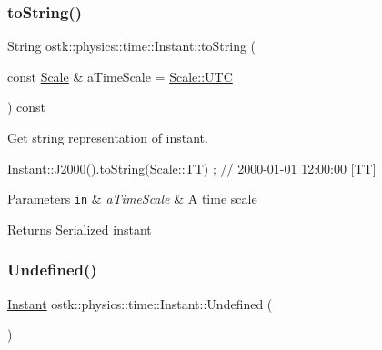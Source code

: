 \subsubsection{\texorpdfstring{to\+String()}{toString()}}
{\footnotesize\ttfamily String ostk\+::physics\+::time\+::\+Instant\+::to\+String (\begin{DoxyParamCaption}\item[{const \hyperlink{namespaceostk_1_1physics_1_1time_adf23d37bd8641fb76a0e98ab46a70df7}{Scale} \&}]{a\+Time\+Scale = {\ttfamily \hyperlink{namespaceostk_1_1physics_1_1time_adf23d37bd8641fb76a0e98ab46a70df7a9234324ddf6b4176b57d803a925b7961}{Scale\+::\+U\+TC}} }\end{DoxyParamCaption}) const}



Get string representation of instant. 


\begin{DoxyCode}
\hyperlink{classostk_1_1physics_1_1time_1_1_instant_a3f84d0c2d0b140326d3b172b54e3ffff}{Instant::J2000}().\hyperlink{classostk_1_1physics_1_1time_1_1_instant_a710ff6dec3b97f4e10bcfeae6335eb56}{toString}(\hyperlink{namespaceostk_1_1physics_1_1time_adf23d37bd8641fb76a0e98ab46a70df7adf1f3edb9115acb0a1e04209b7a9937b}{Scale::TT}) ; \textcolor{comment}{// 2000-01-01 12:00:00 [TT]}
\end{DoxyCode}



\begin{DoxyParams}[1]{Parameters}
\mbox{\tt in}  & {\em a\+Time\+Scale} & A time scale \\
\hline
\end{DoxyParams}
\begin{DoxyReturn}{Returns}
Serialized instant 
\end{DoxyReturn}
\mbox{\label{classostk_1_1physics_1_1time_1_1_instant_a0c95c97e9aa17863aecf8c9ebc821c0b}} 
\subsubsection{\texorpdfstring{Undefined()}{Undefined()}}
{\footnotesize\ttfamily \hyperlink{classostk_1_1physics_1_1time_1_1_instant}{Instant} ostk\+::physics\+::time\+::\+Instant\+::\+Undefined (\begin{DoxyParamCaption}{ }\end{DoxyParamCaption})\hspace{0.3cm}{\ttfamily [static]}}



